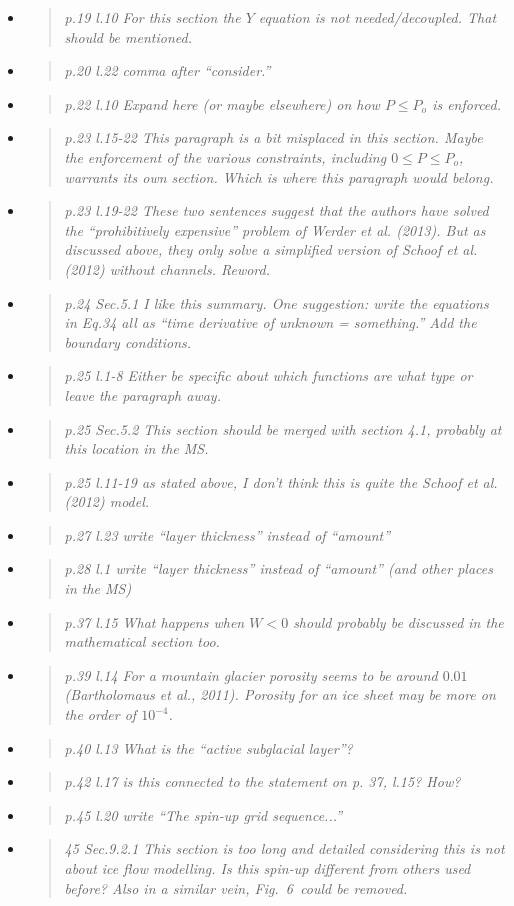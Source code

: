 \documentclass[11pt,reqno]{amsart}
\newcommand{\reply}[2]{
\medskip\medskip
\item  \begin{quote}
\emph{#1}
\end{quote}

\medskip
\noindent #2}
\begin{document}
\begin{itemize}
\reply{p.19 l.10 For this section the $Y$ equation is not needed/decoupled. That should be
mentioned.}
{}

\reply{p.20 l.22 comma after ``consider.''}
{}

\reply{p.22 l.10 Expand here (or maybe elsewhere) on how $P \le P_o$ is enforced.}
{}

\reply{p.23 l.15-22 This paragraph is a bit misplaced in this section.  Maybe the enforcement of the various constraints, including $0 \le P \le P_o$, warrants its own section.  Which is where this paragraph would belong.}
{}

\reply{p.23 l.19-22 These two sentences suggest that the authors have solved the ``prohibitively expensive'' problem of Werder et al. (2013).  But as discussed above, they only solve a simplified version of Schoof et al. (2012) without channels.  Reword.}
{}

\reply{p.24 Sec.5.1 I like this summary. One suggestion: write the equations in Eq.34 all as
``time derivative of unknown = something.'' Add the boundary conditions.}
{}

\reply{p.25 l.1-8 Either be specific about which functions are what type or leave the paragraph away.}
{}

\reply{p.25 Sec.5.2 This section should be merged with section 4.1, probably at this location in the MS.}
{}

\reply{p.25 l.11-19 as stated above, I don’t think this is quite the Schoof et al. (2012) model.}
{}

\reply{p.27 l.23 write ``layer thickness'' instead of ``amount''}
{}

\reply{p.28 l.1 write ``layer thickness'' instead of ``amount'' (and other places in the MS)}
{}

\reply{p.37 l.15 What happens when $W < 0$ should probably be discussed in the mathematical section too.}
{}

\reply{p.39 l.14 For a mountain glacier porosity seems to be around $0.01$ (Bartholomaus
et al., 2011).  Porosity for an ice sheet may be more on the order of $10^{-4}$.}
{}

\reply{p.40 l.13 What is the ``active subglacial layer''?}
{}

\reply{p.42 l.17 is this connected to the statement on p. 37, l.15? How?}
{}

\reply{p.45 l.20 write ``The spin-up grid sequence...''}
{}

\reply{45 Sec.9.2.1 This section is too long and detailed considering this is not about ice flow modelling.  Is this spin-up different from others used before?  Also in a similar
vein, Fig.~6~could be removed.}
{}


\end{itemize}
\end{document}
